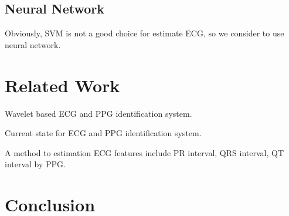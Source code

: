 \documentclass[a4paper,12pt]{article}
\begin{document}
\subsection{Neural Network}
Obviously, SVM is not a good choice for estimate ECG, so we consider to use neural network.

\section{Related Work}
Wavelet based ECG and PPG identification system\autocite{Fatemian:2009wavelet}.

Current state for ECG and PPG identification system\parencite{Abo:2014biometric}.

A method to estimation ECG features include PR interval, QRS interval, QT interval by PPG\parencite{Banerjee:2013estimation}.
\section{Conclusion}

\printbibliography
\end{document}
